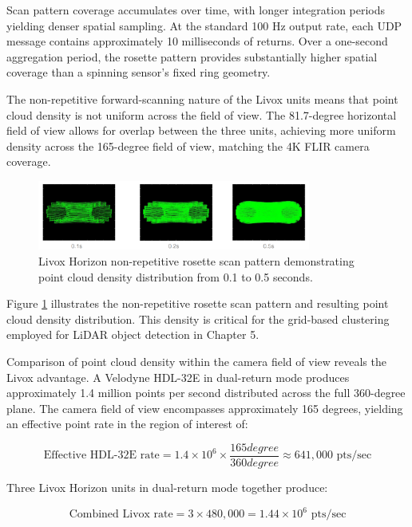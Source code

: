 \documentclass{erauthesis}
\begin{document}
Scan pattern coverage accumulates over time, with longer integration periods yielding denser spatial sampling.
At the standard 100 Hz output rate, each UDP message contains approximately 10 milliseconds of returns.
Over a one-second aggregation period, the rosette pattern provides substantially higher spatial coverage than a spinning sensor's fixed ring geometry.

The non-repetitive forward-scanning nature of the Livox units means that point cloud density is not uniform across the field of view.
The 81.7-degree horizontal field of view allows for overlap between the three units, achieving more uniform density across the 165-degree field of view, matching the 4K FLIR camera coverage.

\begin{figure}[htbp]
\centering
\includegraphics[width=0.8\textwidth]{Images/Livox_1.png}
\caption{Livox Horizon non-repetitive rosette scan pattern demonstrating point cloud density distribution from 0.1 to 0.5 seconds.}
\label{fig:livox_scan_pattern}
\end{figure}

Figure \ref{fig:livox_scan_pattern} illustrates the non-repetitive rosette scan pattern and resulting point cloud density distribution.
This density is critical for the grid-based clustering employed for \ac{LiDAR} object detection in Chapter 5.

Comparison of point cloud density within the camera field of view reveals the Livox advantage.
A Velodyne HDL-32E in dual-return mode produces approximately 1.4 million points per second distributed across the full 360-degree plane.
The camera field of view encompasses approximately 165 degrees, yielding an effective point rate in the region of interest of:

$$\text{Effective HDL-32E rate} = 1.4 \times 10^6 \times \frac{165 degree}{360 degree} \approx 641,000 \text{ pts/sec}$$

Three Livox Horizon units in dual-return mode together produce:

$$\text{Combined Livox rate} = 3 \times 480,000 = 1.44 \times 10^6 \text{ pts/sec}$$
\end{document}
